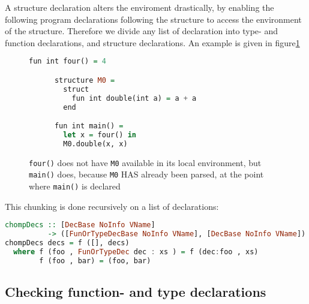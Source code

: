 A structure declaration alters the enviroment drastically, by enabling the
following program declarations following the structure to access the environment
of the structure.
Therefore we divide any list of declaration into type- and function
declarations, and structure declarations.
An example is given in figure\ref{chunks}
\begin{figure}\label{chunks}
  \begin{tcolorbox}
    \begin{lstlisting}[language=Haskell]
      fun int four() = 4

      structure M0 =
        struct
          fun int double(int a) = a + a
        end

      fun int main() =
        let x = four() in
        M0.double(x, x)
  \end{lstlisting}
  \texttt{four()} does not have \texttt{M0} available in its local environment, but
    \texttt{main()} does, because \texttt{M0} HAS already been parsed, at the point where
    \texttt{main()} is declared
  \end{tcolorbox}
\end{figure}

This chunking is done recursively on a list of declarations:
\begin{lstlisting}[language=Haskell]
chompDecs :: [DecBase NoInfo VName]
          -> ([FunOrTypeDecBase NoInfo VName], [DecBase NoInfo VName])
chompDecs decs = f ([], decs)
  where f (foo , FunOrTypeDec dec : xs ) = f (dec:foo , xs)
        f (foo , bar) = (foo, bar)
\end{lstlisting}

\subsection{Checking function- and type declarations}
\label{subsec:checkfunortype}

